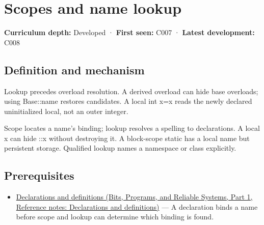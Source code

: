 \hypertarget{appendix-b12b31759da1}{}\label{referencestart:appendix-b12b31759da1}
\section{Scopes and name lookup}\label{appendix-b12b31759da1-scopes-and-name-lookup}

\hypertarget{appendix-b12b31759da1-scopes-and-name-lookup}{}

\textbf{Curriculum depth:} Developed · \textbf{First seen:} C007 · \textbf{Latest development:} C008

\begin{allmightroledefinition}

\subsection{Definition and mechanism}\label{appendix-b12b31759da1-definition-and-mechanism}

\hypertarget{appendix-b12b31759da1-definition-and-mechanism}{}

Lookup precedes overload resolution. A derived overload can hide base overloads; using Base::name restores candidates. A local int x=x reads the newly declared uninitialized local, not an outer integer.

\end{allmightroledefinition}

Scope locates a name's binding; lookup resolves a spelling to declarations. A local x can hide ::x without destroying it. A block-scope static has a local name but persistent storage. Qualified lookup names a namespace or class explicitly.

\subsection{Prerequisites}\label{appendix-b12b31759da1-prerequisites}

\hypertarget{appendix-b12b31759da1-prerequisites}{}

\begin{itemize}
\tightlist
\item
  \href{../01-Bits-Programs-and-Reliable-Systems-P01/main.pdf\#appendix-2e4d494c2d94}{Declarations and definitions (Bits, Programs, and Reliable Systems, Part 1, Reference notes: Declarations and definitions)} --- A declaration binds a name before scope and lookup can determine which binding is found.
\end{itemize}


